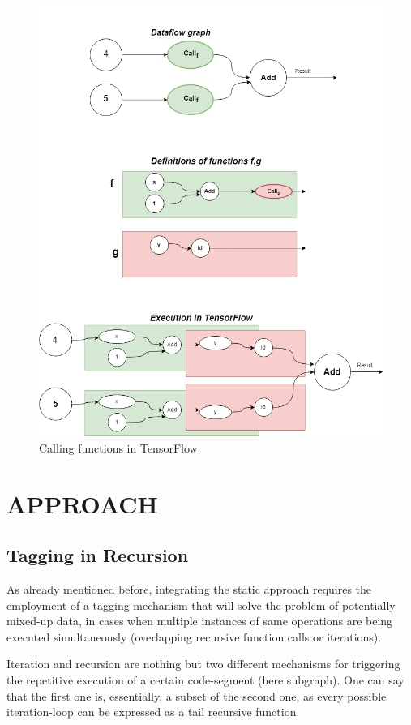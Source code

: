 \documentclass[ack,preface]{dithesis}
\begin{document}
\begin{figure}
\centering
\includegraphics[scale=0.6]{figures/Tf_recursion}
\caption{ Calling functions in TensorFlow}
\end{figure}


\chapter{APPROACH}

    \section{Tagging in Recursion}

As already mentioned before, integrating the static approach requires the employment of a tagging mechanism that will solve the problem of potentially mixed-up data, in cases when multiple instances of same operations are being executed simultaneously (overlapping recursive function calls or iterations).

Iteration and recursion are nothing but two different mechanisms for triggering the repetitive execution of a certain code-segment (here subgraph). One can say that the first one is, essentially, a subset of the second one, as every possible iteration-loop can be expressed as a tail recursive function. 
\end{document}
